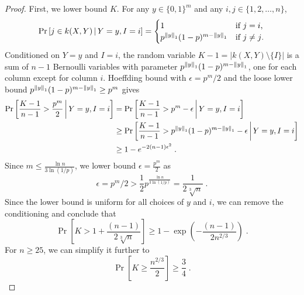 \begin{proof}
First, we lower bound $K$. For any $y \in \{0,1\}^m$ and any $i,j \in \{1,2,\dots,n\}$,
$$
\Pr \left[ j \in k(X,Y)  \, \middle| \, Y = y, I = i \right]
=
\begin{cases}
1 & \text{if $j = i$,} \\
p^{\left\| y \right\|_1} (1 - p)^{m - \left\| y \right\|_1} & \text{if $j \neq j$.}
\end{cases}
$$
Conditioned on $Y = y$ and $I=i$, the random variable $K - 1 = |k(X,Y) \setminus \{I\}|$ is
a sum of $n-1$ Bernoulli variables with parameter $p^{\left\| y \right\|_1} (1 - p)^{m - \left\| y \right\|_1}$, one for each column except for column $i$.
Hoeffding bound with $\epsilon = p^m/2$ and the loose lower bound $p^{\left\| y \right\|_1} (1 - p)^{m - \left\| y \right\|_1} \ge p^m$ gives
\begin{align*}
\Pr \left[ \frac{K - 1}{n - 1} > \frac{p^m}{2}  \, \middle| \,  Y = y, I = i  \right]
& = \Pr \left[ \frac{K - 1}{n - 1} > p^m - \epsilon  \, \middle| \,  Y = y, I = i  \right] \\
& \ge \Pr \left[ \frac{K - 1}{n - 1} > p^{\left\| y \right\|_1} (1 - p)^{m - \left\| y \right\|_1} - \epsilon  \, \middle| \,  Y = y, I = i  \right] \\
& \ge 1 - e^{-2(n-1) \epsilon^2} \; .
\end{align*}
Since $m \le \frac{\ln n}{3 \ln (1/p)}$, we lower bound $\epsilon = \frac{p^m}{2}$ as
$$
\epsilon = p^m/2 > \frac{1}{2} p^\frac{\ln n}{3 \ln(1/p)} = \frac{1}{2\sqrt[3]{n}} \; .
$$
Since the lower bound is uniform for all choices of $y$ and $i$, we can remove
the conditioning and conclude that
$$
\Pr \left[ K > 1 + \frac{(n-1)}{2\sqrt[3]{n}} \right] \ge 1 - \exp \left(- \frac{(n-1)}{2 n^{2/3}} \right) \; .
$$
For $n \ge 25$, we can simplify it further to
$$
\Pr \left[ K \ge \frac{n^{2/3}}{2} \right] \ge \frac{3}{4} \; .
$$


\end{proof}
